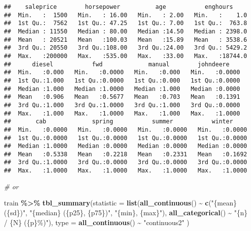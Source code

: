 \documentclass[
]{article}
\newenvironment{Shaded}{\begin{snugshade}}{\end{snugshade}}
\newcommand{\AttributeTok}[1]{\textcolor[rgb]{0.13,0.29,0.53}{#1}}
\newcommand{\CommentTok}[1]{\textcolor[rgb]{0.56,0.35,0.01}{\textit{#1}}}
\newcommand{\FunctionTok}[1]{\textcolor[rgb]{0.13,0.29,0.53}{\textbf{#1}}}
\newcommand{\NormalTok}[1]{#1}
\newcommand{\SpecialCharTok}[1]{\textcolor[rgb]{0.81,0.36,0.00}{\textbf{#1}}}
\newcommand{\StringTok}[1]{\textcolor[rgb]{0.31,0.60,0.02}{#1}}
\begin{document}
\begin{verbatim}
##    saleprice        horsepower          age           enghours      
##  Min.   :  1500   Min.   : 16.00   Min.   : 2.00   Min.   :    1.0  
##  1st Qu.:  7562   1st Qu.: 47.25   1st Qu.: 7.00   1st Qu.:  763.8  
##  Median : 11550   Median : 80.00   Median :14.50   Median : 2398.0  
##  Mean   : 20521   Mean   :100.03   Mean   :15.89   Mean   : 3538.6  
##  3rd Qu.: 20550   3rd Qu.:108.00   3rd Qu.:24.00   3rd Qu.: 5429.2  
##  Max.   :200000   Max.   :535.00   Max.   :33.00   Max.   :18744.0  
##      diesel           fwd             manual        johndeere     
##  Min.   :0.000   Min.   :0.0000   Min.   :0.000   Min.   :0.0000  
##  1st Qu.:1.000   1st Qu.:0.0000   1st Qu.:0.000   1st Qu.:0.0000  
##  Median :1.000   Median :1.0000   Median :1.000   Median :0.0000  
##  Mean   :0.906   Mean   :0.5677   Mean   :0.703   Mean   :0.1391  
##  3rd Qu.:1.000   3rd Qu.:1.0000   3rd Qu.:1.000   3rd Qu.:0.0000  
##  Max.   :1.000   Max.   :1.0000   Max.   :1.000   Max.   :1.0000  
##       cab             spring           summer           winter      
##  Min.   :0.0000   Min.   :0.0000   Min.   :0.0000   Min.   :0.0000  
##  1st Qu.:0.0000   1st Qu.:0.0000   1st Qu.:0.0000   1st Qu.:0.0000  
##  Median :1.0000   Median :0.0000   Median :0.0000   Median :0.0000  
##  Mean   :0.5338   Mean   :0.2218   Mean   :0.2331   Mean   :0.1692  
##  3rd Qu.:1.0000   3rd Qu.:0.0000   3rd Qu.:0.0000   3rd Qu.:0.0000  
##  Max.   :1.0000   Max.   :1.0000   Max.   :1.0000   Max.   :1.0000
\end{verbatim}

\begin{Shaded}
\begin{Highlighting}[]
\CommentTok{\# or }

\NormalTok{train }\SpecialCharTok{\%\textgreater{}\%} 
  \FunctionTok{tbl\_summary}\NormalTok{(}\AttributeTok{statistic =} \FunctionTok{list}\NormalTok{(}\FunctionTok{all\_continuous}\NormalTok{() }\SpecialCharTok{\textasciitilde{}} \FunctionTok{c}\NormalTok{(}\StringTok{"\{mean\} (\{sd\})"}\NormalTok{,}
                                                    \StringTok{"\{median\} (\{p25\}, \{p75\})"}\NormalTok{,}
                                                    \StringTok{"\{min\}, \{max\}"}\NormalTok{),}
                              \FunctionTok{all\_categorical}\NormalTok{() }\SpecialCharTok{\textasciitilde{}} \StringTok{"\{n\} / \{N\} (\{p\}\%)"}\NormalTok{),}
              \AttributeTok{type =} \FunctionTok{all\_continuous}\NormalTok{() }\SpecialCharTok{\textasciitilde{}} \StringTok{"continuous2"}
\NormalTok{  )}
\end{Highlighting}
\end{Shaded}
\end{document}

